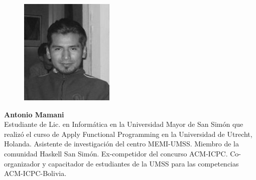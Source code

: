 \newpage
\begin{figure}
 \includegraphics[scale=0.5]{graphics/antonio.png}
\end{figure}
\textbf{Antonio Mamani}\\
Estudiante de Lic. en Inform\'atica en la Universidad Mayor de San Sim\'on que realiz\'o el curso de Apply Functional Programming 
en la Universidad de Utrecht, Holanda. Asistente de investigaci\'on del centro MEMI-UMSS. Miembro de la comunidad Haskell 
San Sim\'on. Ex-competidor del concurso ACM-ICPC. Co-organizador y capacitador de estudiantes de la UMSS para las 
competencias ACM-ICPC-Bolivia. 


